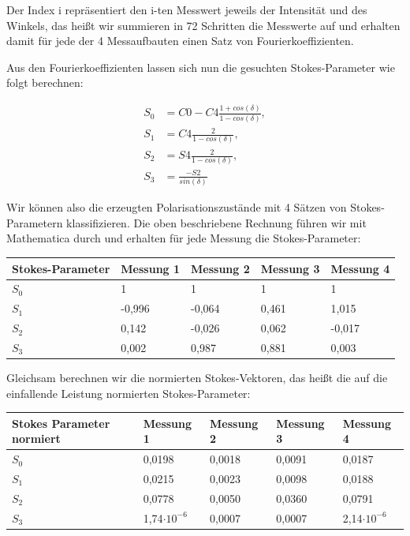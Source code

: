 \documentclass[bigchapter,colorback,accentcolor=tud4b,linedtoc,11pt]{tudreport}
\begin{document}
Der Index i repräsentiert den i-ten Messwert jeweils der Intensität und des Winkels, das heißt wir summieren in 72 Schritten die Messwerte auf und erhalten damit für jede der 4 Messaufbauten einen Satz von Fourierkoeffizienten.

Aus den Fourierkoeffizienten lassen sich nun die gesuchten Stokes-Parameter wie folgt berechnen: 

\begin{align*}
 S_0 &= C0 - C4 \frac{1 + cos(\delta)}{1 - cos(\delta)},\\ 
 S_1 &= C4 \frac{2}{1 - cos(\delta)},\\
 S_2 &= S4 \frac{2}{1 - cos(\delta)},\\
 S_3 &= \frac{-S2}{sin(\delta)} 
\end{align*}

Wir können also die erzeugten Polarisationszustände mit 4 Sätzen von Stokes-Parametern klassifizieren. Die oben beschriebene Rechnung führen wir mit Mathematica durch und erhalten für jede Messung die Stokes-Parameter: 

\begin{center}
  \begin{tabular}{|p{3cm}|p{3cm}|p{3cm}|p{3cm}|p{3cm}|}
    \hline
        Stokes-Parameter & Messung 1 & Messung 2 & Messung 3 & Messung 4 \\ \hline
        $S_0$ & 1 & 1 & 1 & 1 \\ \hline
        $S_1$ & -0,996 & -0,064 & 0,461 & 1,015 \\ \hline
        $S_2$ & 0,142 & -0,026 & 0,062 & -0,017 \\ \hline
        $S_3$ & 0,002 & 0,987 & 0,881 & 0,003 \\ \hline
\end{tabular}
\end{center}

Gleichsam berechnen wir die normierten Stokes-Vektoren, das heißt die auf die einfallende Leistung normierten Stokes-Parameter:

\begin{center}
  \begin{tabular}{|p{3cm}|p{3cm}|p{3cm}|p{3cm}|p{3cm}|}
    \hline
        Stokes Parameter normiert & Messung 1 & Messung 2 & Messung 3 & Messung 4 \\ \hline
        $S_0$ & 0,0198 & 0,0018 & 0,0091 & 0,0187 \\ \hline
        $S_1$ & 0,0215 & 0,0023 & 0,0098 & 0,0188 \\ \hline
        $S_2$ & 0,0778 & 0,0050 & 0,0360 & 0,0791 \\ \hline
        $S_3$ & 1,74$\cdot 10^{-6}$ & 0,0007 & 0,0007 & 2,14$\cdot 10^{-6}$ \\ \hline
\end{tabular}
\end{center}
\end{document}
